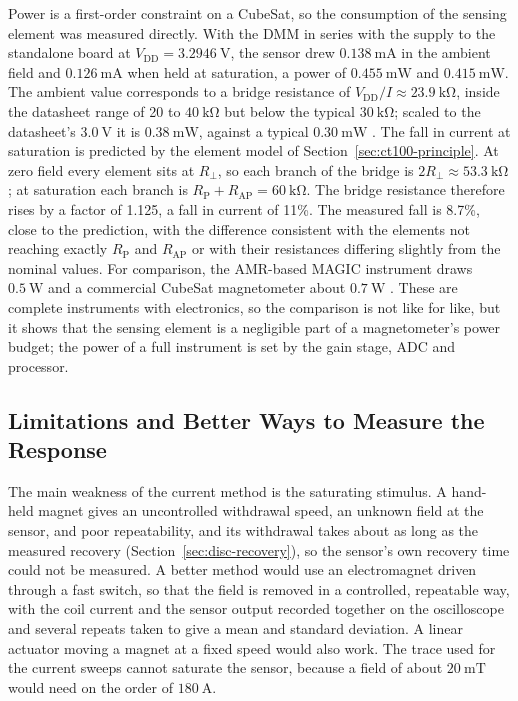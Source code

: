 \documentclass[12pt,a4paper]{article}
\begin{document}
Power is a first-order constraint on a CubeSat, so the consumption of the sensing element was measured directly. With the DMM in series with the supply to the standalone board at $V_{\text{DD}} = \SI{3.2946}{\volt}$, the sensor drew $\SI{0.138}{\milli\ampere}$ in the ambient field and $\SI{0.126}{\milli\ampere}$ when held at saturation, a power of $\SI{0.455}{\milli\watt}$ and $\SI{0.415}{\milli\watt}$. The ambient value corresponds to a bridge resistance of $V_{\text{DD}}/I \approx \SI{23.9}{\kilo\ohm}$, inside the datasheet range of 20 to $\SI{40}{\kilo\ohm}$ but below the typical $\SI{30}{\kilo\ohm}$; scaled to the datasheet's $\SI{3.0}{\volt}$ it is $\SI{0.38}{\milli\watt}$, against a typical $\SI{0.30}{\milli\watt}$ \cite{ct100_datasheet}. The fall in current at saturation is predicted by the element model of Section~\ref{sec:ct100-principle}. At zero field every element sits at $R_\perp$, so each branch of the bridge is $2R_\perp \approx \SI{53.3}{\kilo\ohm}$; at saturation each branch is $R_{\text{P}} + R_{\text{AP}} = \SI{60}{\kilo\ohm}$. The bridge resistance therefore rises by a factor of 1.125, a fall in current of 11\%. The measured fall is 8.7\%, close to the prediction, with the difference consistent with the elements not reaching exactly $R_{\text{P}}$ and $R_{\text{AP}}$ or with their resistances differing slightly from the nominal values. For comparison, the AMR-based MAGIC instrument draws $\SI{0.5}{\watt}$ \cite{magic-radcube} and a commercial CubeSat magnetometer about $\SI{0.7}{\watt}$ \cite{nss_magnetometer}. These are complete instruments with electronics, so the comparison is not like for like, but it shows that the sensing element is a negligible part of a magnetometer's power budget; the power of a full instrument is set by the gain stage, ADC and processor.

\subsection{Limitations and Better Ways to Measure the Response}
\label{sec:disc-limitations}

The main weakness of the current method is the saturating stimulus. A hand-held magnet gives an uncontrolled withdrawal speed, an unknown field at the sensor, and poor repeatability, and its withdrawal takes about as long as the measured recovery (Section~\ref{sec:disc-recovery}), so the sensor's own recovery time could not be measured. A better method would use an electromagnet driven through a fast switch, so that the field is removed in a controlled, repeatable way, with the coil current and the sensor output recorded together on the oscilloscope and several repeats taken to give a mean and standard deviation. A linear actuator moving a magnet at a fixed speed would also work. The trace used for the current sweeps cannot saturate the sensor, because a field of about $\SI{20}{\milli\tesla}$ would need on the order of $\SI{180}{\ampere}$.
\end{document}

